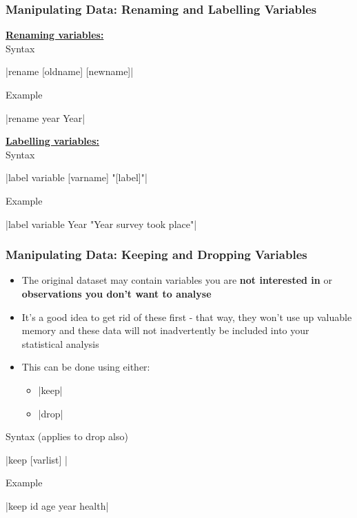 \documentclass[10pt, compress]{beamer}
\begin{document}
\begin{frame}[fragile]
\frametitle{Manipulating Data: Renaming and Labelling Variables}
\underline{\textbf{Renaming variables:}}\\
\alert{Syntax}
\begin{center}
|rename [oldname] [newname]|
\end{center}
\alert{Example}
\begin{center}
|rename year Year|
\end{center}
\underline{\textbf{Labelling variables:}}\\
\alert{Syntax}
\begin{center}
|label variable [varname] "[label]"|
\end{center}
\alert{Example}
\begin{center}
|label variable Year "Year survey took place"|
\end{center}
\end{frame}

\begin{frame}[fragile]
\frametitle{Manipulating Data: Keeping and Dropping Variables}
\begin{itemize}
\item The original dataset may contain variables you are \textbf{not interested in} or \textbf{observations you don't want to analyse} 
\item It's a good idea to get rid of these first - that way, they won't use up valuable memory and these data will not inadvertently be included into your statistical analysis
\item This can be done using either:
\begin{itemize}
\item {}|keep|
\item {}|drop|
\end{itemize}
\end{itemize}
\alert{Syntax (applies to drop also)}
\begin{center}
|keep [varlist] |
\end{center}
\alert{Example}
\begin{center}
|keep id age year health|
\end{center}
\end{frame}
\end{document}
